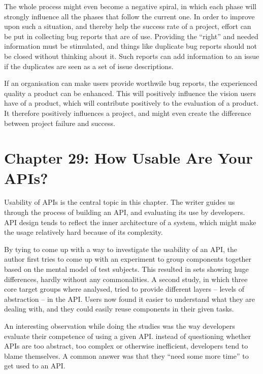 \documentclass[]{uva-bachelor-thesis}
\begin{document}
The whole process might even become a negative spiral, in which each phase will strongly influence all the phases that follow the current one.
In order to improve upon such a situation, and thereby help the success rate of a project, effort can be put in collecting bug reports that are of use. 
Providing the ``right'' and needed information must be stimulated, and things like duplicate bug reports should not be closed without thinking about it. 
Such reports can add information to an issue if the duplicates are seen as a set of issue descriptions. 

If an organisation can make users provide worthwile bug reports, the experienced quality a product can be enhanced.
This will positively influence the vision users have of a product, which will contribute positively to the evaluation of a product. 
It therefore positively influences a project, and might even create the difference between project failure and success.

\chapter{Chapter 29: How Usable Are Your APIs? \cite{makingsoftware}}
Usability of APIs is the central topic in this chapter. 
The writer guides us through the process of building an API, and evaluating its use by developers.
API design tends to reflect the inner architecture of a system, which might make the usage relatively hard because of its complexity. 

By tying to come up with a way to investigate the usability of an API, the author first tries to come up with an experiment to group components together based on the mental model of test subjects. 
This resulted in sets showing huge differences, hardly without any commonalities. 
A second study, in which three core target groups where analysed, tried to provide different layers -- levels of abstraction -- in the API.
Users now found it easier to understand what they are dealing with, and they could easily reuse components in their given tasks. 

An interesting observation while doing the studies was the way developers evaluate their competence of using a given API. 
instead of questioning whether APIs are too abstract, too complex or otherwise inefficient, developers tend to blame themselves. 
A common answer was that they ``need some more time'' to get used to an API.
\end{document}
